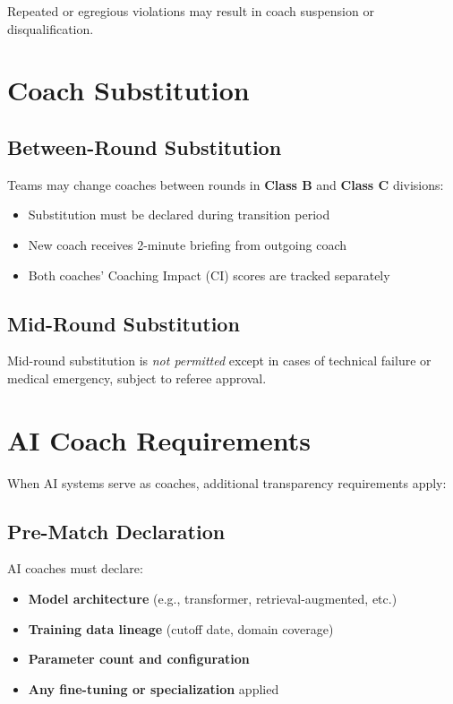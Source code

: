 Repeated or egregious violations may result in coach suspension or disqualification.

\section{Coach Substitution}

\subsection{Between-Round Substitution}

Teams may change coaches between rounds in \textbf{Class B} and \textbf{Class C} divisions:
\begin{itemize}[leftmargin=*]
  \item Substitution must be declared during transition period
  \item New coach receives 2-minute briefing from outgoing coach
  \item Both coaches' Coaching Impact (CI) scores are tracked separately
\end{itemize}

\subsection{Mid-Round Substitution}

Mid-round substitution is \textit{not permitted} except in cases of technical failure or medical emergency, subject to referee approval.

\section{AI Coach Requirements}

When AI systems serve as coaches, additional transparency requirements apply:

\subsection{Pre-Match Declaration}

AI coaches must declare:
\begin{itemize}[leftmargin=*]
  \item \textbf{Model architecture} (e.g., transformer, retrieval-augmented, etc.)
  \item \textbf{Training data lineage} (cutoff date, domain coverage)
  \item \textbf{Parameter count and configuration}
  \item \textbf{Any fine-tuning or specialization} applied
\end{itemize}

